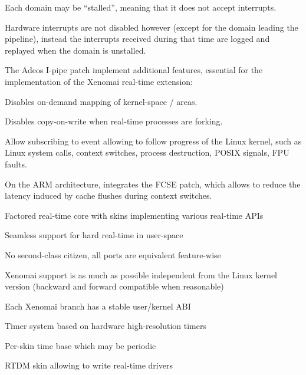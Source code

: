     \startitemize
    \item Each domain may be “stalled”, meaning that it does not
      accept interrupts.
    \item Hardware interrupts are not disabled however (except for the
      domain leading the pipeline), instead the interrupts received
      during that time are logged and replayed when the domain is
      unstalled.
    \stopitemize

  \startitemize
  \item The Adeos I-pipe patch implement additional features,
    essential for the implementation of the Xenomai real-time
    extension:
    \startitemize
    \item Disables on-demand mapping of kernel-space  /
     areas.
    \item Disables copy-on-write when real-time processes are forking.
    \item Allow subscribing to event allowing to follow progress of
      the Linux kernel, such as Linux system calls, context switches,
      process destruction, POSIX signals, FPU faults.
    \item On the ARM architecture, integrates the FCSE patch, which
      allows to reduce the latency induced by cache flushes during
      context switches.
    \stopitemize
  \stopitemize

  \startitemize
  \item Factored real-time core with skins implementing various
    real-time APIs
  \item Seamless support for hard real-time in user-space
  \item No second-class citizen, all ports are equivalent feature-wise
  \item Xenomai support is as much as possible independent from the
    Linux kernel version (backward and forward compatible when
    reasonable)
  \item Each Xenomai branch has a stable user/kernel ABI
  \item Timer system based on hardware high-resolution timers
  \item Per-skin time base which may be periodic
  \item RTDM skin allowing to write real-time drivers
  \stopitemize

